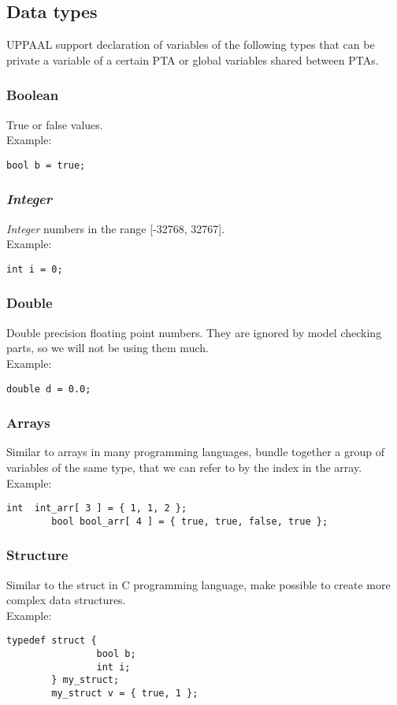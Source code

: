 \subsection{Data types}
UPPAAL support declaration of variables of the following types that can be private a variable of a certain PTA or global variables shared between PTAs.\\
\subsubsection{Boolean}
True or false values.\\
Example:\begin{lstlisting}[style=styleuppaal]
        bool b = true; 
\end{lstlisting}
\subsubsection{\textit{Integer}}
\textit{Integer} numbers in the range [-32768, 32767]. \\
Example:\begin{lstlisting}[style=styleuppaal]
        int i = 0; \end{lstlisting}
\subsubsection{Double}
Double precision floating point numbers. They are ignored by model checking parts, so we will not be using them much.\\
Example:\begin{lstlisting}[style=styleuppaal]
        double d = 0.0; \end{lstlisting}
\subsubsection{Arrays}
Similar to arrays in many programming languages, bundle together a group of variables of the same type, that we can refer to by the index in the array.\\
Example:\begin{lstlisting}[style=styleuppaal]
        int  int_arr[ 3 ] = { 1, 1, 2 };
        bool bool_arr[ 4 ] = { true, true, false, true }; \end{lstlisting}
\subsubsection{Structure}
Similar to the struct in C programming language, make possible to create more complex data structures.\\
Example:\begin{lstlisting}[style=styleuppaal]
        typedef struct {
                bool b;
                int i;
        } my_struct;
        my_struct v = { true, 1 }; \end{lstlisting}
